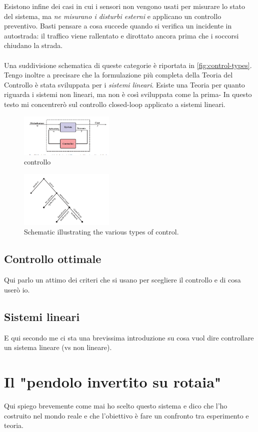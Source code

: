 Esistono infine dei casi in cui i sensori non vengono usati per misurare
lo stato del sistema, ma \emph{ne misurano i disturbi esterni} e applicano un
controllo preventivo. Basti pensare a cosa succede quando si verifica un incidente
in autostrada: il traffico viene rallentato e dirottato ancora prima che i soccorsi
chiudano la strada.

\paragraph{}
Una suddivisione schematica di queste categorie è riportata in \autoref{fig:control-types}.
Tengo inoltre a precisare che la formulazione più completa della Teoria del Controllo
è stata sviluppata per i \emph{sistemi lineari}. Esiste una Teoria per quanto riguarda
i sistemi non lineari, ma non è così sviluppata come la prima-
In questo testo mi concentrerò sul controllo closed-loop applicato a sistemi lineari.

\begin{figure}[thb]
    \centering
    \includegraphics[width=0.4\textwidth]{assets/open-vs-closed.png}
    \caption{controllo }%
    \label{fig:open-vs-closed}
\end{figure}


\begin{figure}[thb]
    \centering
    \includegraphics[width=0.4\textwidth]{assets/control-types.png}
    \caption{Schematic illustrating the various types of control.} %
    \label{fig:control-types}
\end{figure}

\subsection{Controllo ottimale}
\label{subsec:controllo-ottimale}
Qui parlo un attimo dei criteri che si usano per scegliere il controllo e di
cosa userò io.

\subsection{Sistemi lineari}
E qui secondo me ci sta una brevissima introduzione su cosa vuol dire
controllare un sistema lineare (vs non lineare).

\section{Il "pendolo invertito su rotaia"}
Qui spiego brevemente come mai ho scelto questo sistema e dico che l'ho costruito nel mondo reale  e che l'obiettivo è fare un confronto tra esperimento e teoria.
\fi